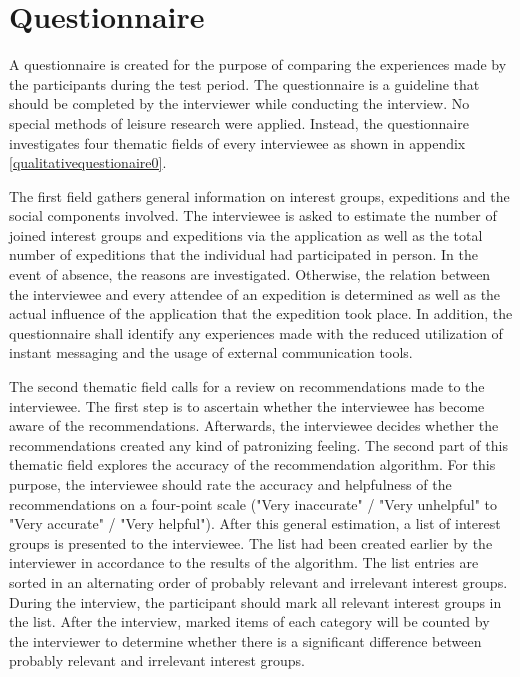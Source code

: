 \documentclass[12pt,numbers=noenddot,parskip,bibliography=totocnumbered,listof=totocnumbered,draft]{scrreprt}
\begin{document}
\section{Questionnaire}
A questionnaire is created for the purpose of comparing the experiences made by the participants during the test period. The questionnaire is a guideline that should be completed by the interviewer while conducting the interview. No special methods of leisure research were applied. Instead, the questionnaire investigates four thematic fields of every interviewee as shown in appendix \ref{qualitativequestionaire0}. 

The first field gathers general information on interest groups, expeditions and the social components involved. The interviewee is asked to estimate the number of joined interest groups and expeditions via the application as well as the total number of expeditions that the individual had participated in person. In the event of absence, the reasons are investigated. Otherwise, the relation between the interviewee and every attendee of an expedition is determined as well as the actual influence of the application that the expedition took place. In addition, the questionnaire shall identify any experiences made with the reduced utilization of instant messaging and the usage of external communication tools. 

The second thematic field calls for a review on recommendations made to the interviewee. The first step is to ascertain whether the interviewee has become aware of the recommendations. Afterwards, the interviewee decides whether the recommendations created any kind of patronizing feeling. The second part of this thematic field explores the accuracy of the recommendation algorithm. For this purpose, the interviewee should rate the accuracy and helpfulness of the recommendations on a four-point scale ("Very inaccurate" / "Very unhelpful" to "Very accurate" / "Very helpful"). After this general estimation, a list of interest groups is presented to the interviewee. The list had been created earlier by the interviewer in accordance to the results of the algorithm. The list entries are sorted in an alternating order of probably relevant and irrelevant interest groups. During the interview, the participant should mark all relevant interest groups in the list. After the interview, marked items of each category will be counted by the interviewer to determine whether there is a significant difference between probably relevant and irrelevant interest groups.
\end{document}
